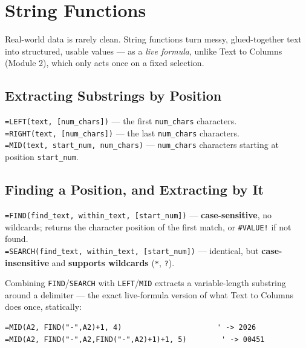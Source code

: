 \documentclass[11pt,a4paper]{article}
\begin{document}
\section{String Functions}
\label{sec:stringfunctions}

Real-world data is rarely clean. String functions turn messy, glued-together text into structured, usable values --- as a \emph{live formula}, unlike Text to Columns (Module 2), which only acts once on a fixed selection.

\subsection{Extracting Substrings by Position}

\begin{formulasyntax}
\texttt{=LEFT(text, [num\_chars])} --- the first \texttt{num\_chars} characters.\\
\texttt{=RIGHT(text, [num\_chars])} --- the last \texttt{num\_chars} characters.\\
\texttt{=MID(text, start\_num, num\_chars)} --- \texttt{num\_chars} characters starting at position \texttt{start\_num}.
\end{formulasyntax}

\subsection{Finding a Position, and Extracting by It}

\begin{formulasyntax}
\texttt{=FIND(find\_text, within\_text, [start\_num])} --- \textbf{case-sensitive}, no wildcards; returns the character position of the first match, or \texttt{\#VALUE!} if not found.\\
\texttt{=SEARCH(find\_text, within\_text, [start\_num])} --- identical, but \textbf{case-insensitive} and \textbf{supports wildcards} (\texttt{*}, \texttt{?}).
\end{formulasyntax}

Combining \texttt{FIND}/\texttt{SEARCH} with \texttt{LEFT}/\texttt{MID} extracts a variable-length substring around a delimiter --- the exact live-formula version of what Text to Columns does once, statically:

\begin{lstlisting}[style=excelstyle, caption={Extracting the year and the sequence number from "INV-2026-00451" without Text to Columns}]
=MID(A2, FIND("-",A2)+1, 4)                      ' -> 2026
=MID(A2, FIND("-",A2,FIND("-",A2)+1)+1, 5)        ' -> 00451
\end{lstlisting}
\end{document}
